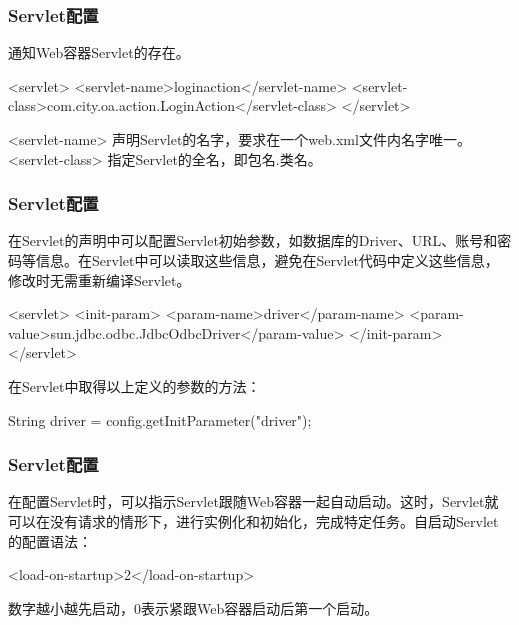 \begin{frame}[fragile] %
\frametitle{Servlet配置}

通知Web容器Servlet的存在。

\begin{xmlCode}
<servlet>
  <servlet-name>loginaction</servlet-name>
  <servlet-class>com.city.oa.action.LoginAction</servlet-class>
</servlet>  
\end{xmlCode}

<servlet-name> 声明Servlet的名字，要求在一个web.xml文件内名字唯一。\\
<servlet-class> 指定Servlet的全名，即包名.类名。\\
\end{frame}

\begin{frame}[fragile] %
\frametitle{Servlet配置}

在Servlet的声明中可以配置Servlet初始参数，如数据库的Driver、URL、账号和密码等信息。在Servlet中可以读取这些信息，避免在Servlet代码中定义这些信息，修改时无需重新编译Servlet。

\begin{xmlCode}
<servlet>
  <init-param>
    <param-name>driver</param-name>
    <param-value>sun.jdbc.odbc.JdbcOdbcDriver</param-value>
  </init-param>
</servlet>
\end{xmlCode}

在Servlet中取得以上定义的参数的方法：

\begin{javaCode}
String driver = config.getInitParameter("driver");
\end{javaCode}
\end{frame}

\begin{frame}[fragile] %
\frametitle{Servlet配置}

在配置Servlet时，可以指示Servlet跟随Web容器一起自动启动。这时，Servlet就可以在没有请求的情形下，进行实例化和初始化，完成特定任务。自启动Servlet的配置语法：

\begin{xmlCode}
<load-on-startup>2</load-on-startup>
\end{xmlCode}

数字越小越先启动，0表示紧跟Web容器启动后第一个启动。
\end{frame}

